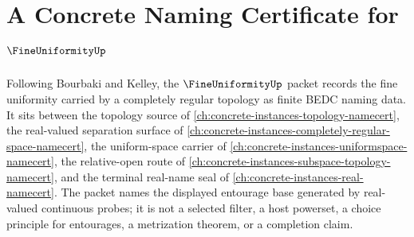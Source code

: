 \chapter{A Concrete Naming Certificate for $\FineUniformityUp$}
\label{ch:concrete-instances-fine-uniformity-namecert}

Following Bourbaki and Kelley, the $\FineUniformityUp$ packet records the fine uniformity carried by a completely regular topology as finite BEDC naming data. It sits between the topology source of \autoref{ch:concrete-instances-topology-namecert}, the real-valued separation surface of \autoref{ch:concrete-instances-completely-regular-space-namecert}, the uniform-space carrier of \autoref{ch:concrete-instances-uniformspace-namecert}, the relative-open route of \autoref{ch:concrete-instances-subspace-topology-namecert}, and the terminal real-name seal of \autoref{ch:concrete-instances-real-namecert}. The packet names the displayed entourage base generated by real-valued continuous probes; it is not a selected filter, a host powerset, a choice principle for entourages, a metrization theorem, or a completion claim.

